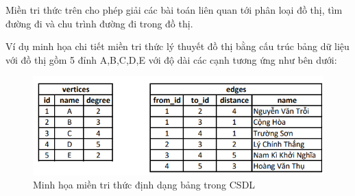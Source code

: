 Miền tri thức trên cho phép giải các bài toán liên quan tới phân loại đồ thị, tìm đường đi và chu trình đường đi trong đồ thị.

Ví dụ minh họa chi tiết miền tri thức lý thuyết đồ thị bằng cấu trúc bảng dữ liệu với đồ thị gồm 5 đỉnh A,B,C,D,E với độ dài các cạnh tương ứng như bên dưới:

\begin{figure}[h]
	\centering
	\includegraphics[width= 0.9\linewidth]{tables.PNG}
	\caption{Minh họa miền tri thức định dạng bảng trong CSDL}
	\label{fig-3: dinh dang mien-tri-thuc}
\end{figure}
